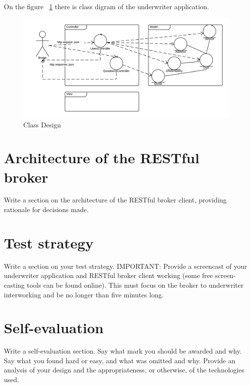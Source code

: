 \documentclass[10pt,a4paper,headinclude=true,twoside]{report}
\begin{document}
On the figure ~\ref{fig:ClassDesign} there is class digram of the underwriter application. 

\begin{figure}[H]
\centering
\centerline{\includegraphics[scale=0.25]{./ClassDesign}}
\caption{Class Design}
\label{fig:ClassDesign}
\end{figure}


\section{Architecture of the RESTful broker}
Write a section on the architecture of the RESTful broker client,
providing rationale for decisions made.
\section{Test strategy}
Write a section on your test strategy. IMPORTANT: Provide a
screencast of your underwriter application and RESTful broker client
working (some free screen-casting tools can be found online). This
must focus on the broker to underwriter interworking and be no longer
than five minutes long.
\section{Self-evaluation}
Write a self-evaluation section. Say what mark you should be awarded
and why. Say what you found hard or easy, and what was omitted and
why. Provide an analysis of your design and the appropriateness, or
otherwise, of the technologies used.



\end{document}
